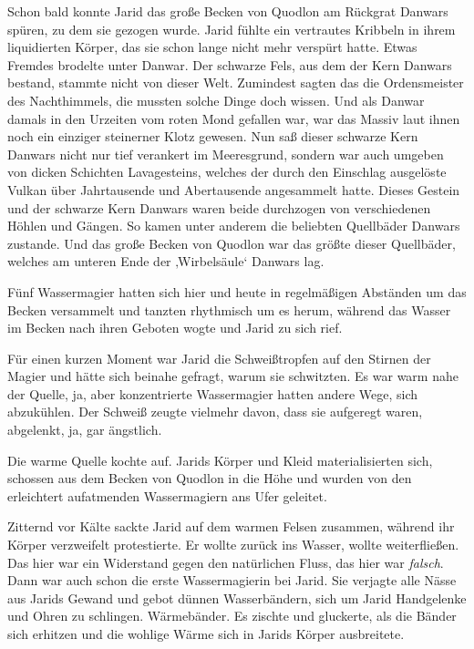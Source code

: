 Schon bald konnte Jarid das große Becken von Quodlon am Rückgrat Danwars spüren, zu dem sie gezogen wurde. Jarid fühlte ein vertrautes Kribbeln in ihrem liquidierten Körper, das sie schon lange nicht mehr verspürt hatte. Etwas Fremdes brodelte unter Danwar. Der schwarze Fels, aus dem der Kern Danwars bestand, stammte nicht von dieser Welt. Zumindest sagten das die Ordensmeister des Nachthimmels, die mussten solche Dinge doch wissen. Und als Danwar damals in den Urzeiten vom roten Mond gefallen war, war das Massiv laut ihnen noch ein einziger steinerner Klotz gewesen. Nun saß dieser schwarze Kern Danwars nicht nur tief verankert im Meeresgrund, sondern war auch umgeben von dicken Schichten Lavagesteins, welches der durch den Einschlag ausgelöste Vulkan über Jahrtausende und Abertausende angesammelt hatte. Dieses Gestein und der schwarze Kern Danwars waren beide durchzogen von verschiedenen Höhlen und Gängen. So kamen unter anderem die beliebten Quellbäder Danwars zustande. Und das große Becken von Quodlon war das größte dieser Quellbäder, welches am unteren Ende der ‚Wirbelsäule‘ Danwars lag.

Fünf Wassermagier hatten sich hier und heute in regelmäßigen Abständen um das Becken versammelt und tanzten rhythmisch um es herum, während das Wasser im Becken nach ihren Geboten wogte und Jarid zu sich rief.

Für einen kurzen Moment war Jarid die Schweißtropfen auf den Stirnen der Magier und hätte sich beinahe gefragt, warum sie schwitzten. Es war warm nahe der Quelle, ja, aber konzentrierte Wassermagier hatten andere Wege, sich abzukühlen. Der Schweiß zeugte vielmehr davon, dass sie aufgeregt waren, abgelenkt, ja, gar ängstlich.

Die warme Quelle kochte auf. Jarids Körper und Kleid materialisierten sich, schossen aus dem Becken von Quodlon in die Höhe und wurden von den erleichtert aufatmenden Wassermagiern ans Ufer geleitet.

Zitternd vor Kälte sackte Jarid auf dem warmen Felsen zusammen, während ihr Körper verzweifelt protestierte. Er wollte zurück ins Wasser, wollte weiterfließen. Das hier war ein Widerstand gegen den natürlichen Fluss, das hier war \textit{falsch}. Dann war auch schon die erste Wassermagierin bei Jarid. Sie verjagte alle Nässe aus Jarids Gewand und gebot dünnen Wasserbändern, sich um Jarid Handgelenke und Ohren zu schlingen. Wärmebänder. Es zischte und gluckerte, als die Bänder sich erhitzen und die wohlige Wärme sich in Jarids Körper ausbreitete.

